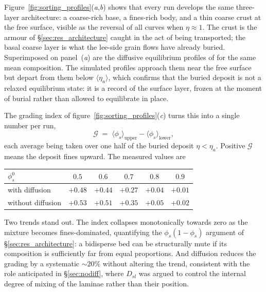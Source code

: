 \documentclass[lineno]{JFM-FLM_Au}
\begin{document}
Figure~\ref{fig:sorting_profiles}(\textit{a},\textit{b}) shows that every run
develops the same three-layer architecture: a coarse-rich base, a fines-rich
body, and a thin coarse crust at the free surface, visible as the reversal of
all curves when $\eta \approx 1$. The crust is the armour of
\S\ref{sec:res_architecture} caught in the act of being transported; the basal
coarse layer is what the lee-side grain flows have already buried. Superimposed
on panel~(\textit{a}) are the diffusive equilibrium profiles of
\citet{graychugunov2006} for the same mean composition. The simulated profiles
approach them near the free surface but depart from them below
$\langle\eta_a\rangle$, which confirms that the buried deposit is not a
relaxed equilibrium state: it is a record of the surface layer, frozen at the
moment of burial rather than allowed to equilibrate in place.

The grading index of figure~\ref{fig:sorting_profiles}(\textit{c}) turns this
into a single number per run,
\begin{equation}
\mathcal{G} \;=\;
  \langle\phi_s\rangle_{\mathrm{upper}} - \langle\phi_s\rangle_{\mathrm{lower}},
\label{eq:grading}
\end{equation}
each average being taken over one half of the buried deposit $\eta < \eta_a$.
Positive $\mathcal{G}$ means the deposit fines upward. The measured values are

\begin{center}
\footnotesize
\begin{tabular}{lccccc}
\toprule
$\phi_s^0$ & $0.5$ & $0.6$ & $0.7$ & $0.8$ & $0.9$ \\
\midrule
with diffusion & $+0.48$ & $+0.44$ & $+0.27$ & $+0.04$ & $+0.01$ \\
without diffusion & $+0.53$ & $+0.51$ & $+0.35$ & $+0.05$ & $+0.02$ \\
\bottomrule
\end{tabular}
\end{center}

\noindent
Two trends stand out. The index collapses monotonically towards zero as the
mixture becomes fines-dominated, quantifying the $\phi_s(1-\phi_s)$ argument of
\S\ref{sec:res_architecture}: a bidisperse bed can be structurally mute if its
composition is sufficiently far from equal proportions. And diffusion reduces
the grading by a systematic $\sim 20\%$ without altering the trend, consistent
with the role anticipated in \S\ref{sec:nodiff}, where $D_{sl}$ was argued to
control the internal degree of mixing of the laminae rather than their
position.
\end{document}

